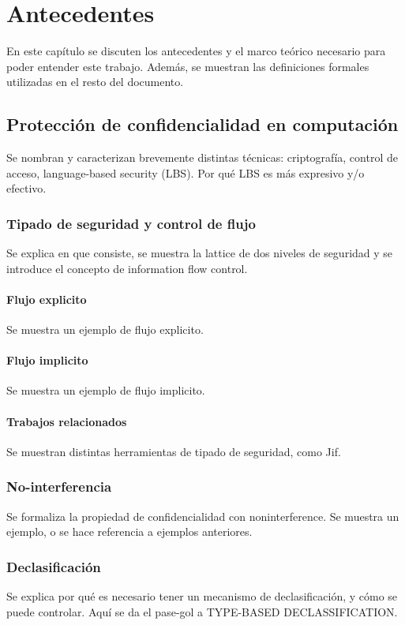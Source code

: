 \chapter{Antecedentes}

En este capítulo se discuten los antecedentes y el marco teórico necesario para poder entender este trabajo. Además, se muestran las definiciones formales utilizadas en el resto del documento.

\section{Protección de confidencialidad en computación}
Se nombran y caracterizan brevemente distintas técnicas: criptografía, control de acceso, language-based security (LBS). Por qué LBS es más expresivo y/o efectivo.

\subsection{Tipado de seguridad y control de flujo}
Se explica en que consiste, se muestra la lattice de dos niveles de seguridad y se introduce el concepto de information flow control.
\subsubsection{Flujo explicito}
Se muestra un ejemplo de flujo explicito.
\subsubsection{Flujo implicito}
Se muestra un ejemplo de flujo implicito.
\subsubsection{Trabajos relacionados}
Se muestran distintas herramientas de tipado de seguridad, como Jif.
\subsection{No-interferencia}
Se formaliza la propiedad de confidencialidad con noninterference. Se muestra un ejemplo, o se hace referencia a ejemplos anteriores.

\subsection{Declasificación}
Se explica por qué es necesario tener un mecanismo de declasificación, y cómo se puede controlar. Aquí se da el pase-gol a TYPE-BASED DECLASSIFICATION.
